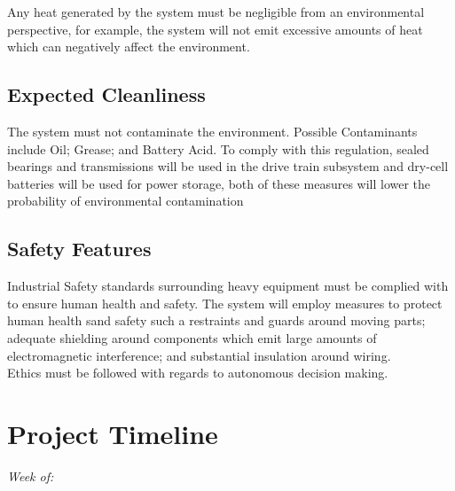 \documentclass[12pt]{article}
\begin{document}
Any heat generated by the system must be negligible from an environmental perspective, for example, the system will not emit excessive amounts of heat which can negatively affect the environment. 
\subsection{Expected Cleanliness}
The system must not contaminate the environment. Possible Contaminants include Oil; Grease; and Battery Acid. To comply with this regulation, sealed bearings and transmissions will be used in the drive train subsystem and dry-cell batteries will be used for power storage, both of these measures will lower the probability of environmental contamination
\subsection{Safety Features}
Industrial Safety standards surrounding heavy equipment must be complied with to ensure human health and safety. The system will employ measures to protect human health sand safety such a restraints and guards around moving parts; adequate shielding around components which emit large amounts of electromagnetic interference; and substantial insulation around wiring. \\

Ethics must be followed with regards to autonomous decision making. 

\clearpage
\section{Project Timeline}


\textit{Week of:}
\end{document}
